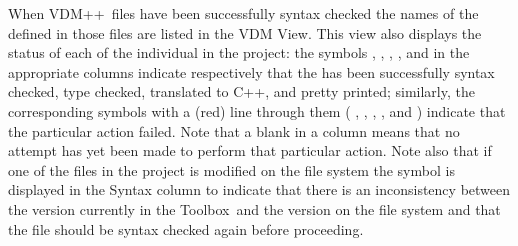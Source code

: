 \documentclass[\pformat,12pt]{article}
\newcommand{\vdmslpp}{VDM++}
\newcommand{\Toolbox}{Toolbox}
\newcommand{\vdmModView}{\guicmd{VDM View}}
\newcommand{\guicmd}[1]{{\sf #1}}
\begin{document}
When \vdmslpp\ files have been successfully syntax checked the names
of the  defined in those
files are listed in the \vdmModView. This view also displays the
status of each of the individual 
 in the project: the
symbols 
,
,
,
,
and
in the appropriate columns indicate respectively that the
 has been successfully
syntax checked, type checked, translated to C++,
 and pretty
printed;
similarly, the corresponding symbols with a (red) line through them (%
,
,
,
,
and
)
indicate that the particular action failed. Note that a blank in a
column means that no attempt has yet been made to perform that
particular action. Note also that if one of the files in the project
is modified on the file system the symbol
is displayed in the \guicmd{Syntax} column  to indicate
that there is an inconsistency between the version currently in the \Toolbox\ and the
version on the file system and that the file should be syntax checked
again before proceeding.
\end{document}

